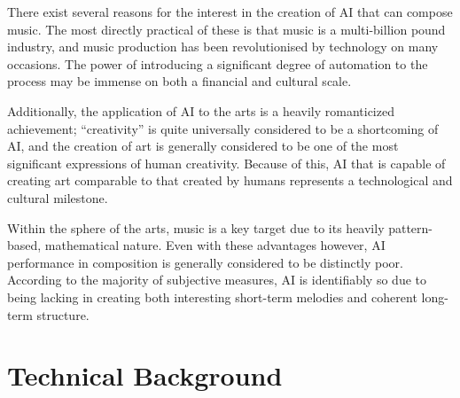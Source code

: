 \documentclass[ author={Stephen Livermore-Tozer},
				supervisor={Dr. Peter Flach},
				degree={MEng},
				title={Performing Algorithmic Co-composition Using Machine Learning},
				subtitle={},
				type={research},
				year={2016} ]{dissertation}
\begin{document}
	
	
	There exist several reasons for the interest in the creation of AI that can compose music. The most directly practical of these is that music is a multi-billion pound industry, and music production has been revolutionised by technology on many occasions. The power of introducing a significant degree of automation to the process may be immense on both a financial and cultural scale.
	
	Additionally, the application of AI to the arts is a heavily romanticized achievement; ``creativity'' is quite universally considered to be a shortcoming of AI, and the creation of art is generally considered to be one of the most significant expressions of human creativity. Because of this, AI that is capable of creating art comparable to that created by humans represents a technological and cultural milestone.
	
	Within the sphere of the arts, music is a key target due to its heavily pattern-based, mathematical nature. Even with these advantages however, AI performance in composition is generally considered to be distinctly poor. According to the majority of subjective measures, AI is identifiably so due to being lacking in creating both interesting short-term melodies and coherent long-term structure. 
	
	
	
	
	\chapter{Technical Background}
	\label{chap:technical}
	
	
	
	
\end{document}
